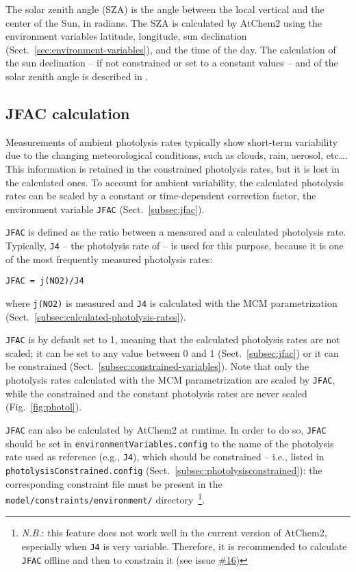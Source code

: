 The solar zenith angle (SZA) is the angle between the local vertical
and the center of the Sun, in radians. The SZA is calculated by
AtChem2 using the environment variables latitude, longitude, sun
declination (Sect.~\ref{sec:environment-variables}), and the time of
the day. The calculation of the sun declination -- if not constrained
or set to a constant values -- and of the solar zenith angle is
described in \citet{madronich_1993}.

\subsection{JFAC calculation} \label{subsec:jfac-calculation}

Measurements of ambient photolysis rates typically show short-term
variability due to the changing meteorological conditions, such as
clouds, rain, aerosol, etc\ldots. This information is retained in the
constrained photolysis rates, but it is lost in the calculated
ones. To account for ambient variability, the calculated photolysis
rates can be scaled by a constant or time-dependent correction factor,
the environment variable \texttt{JFAC} (Sect.~\ref{subsec:jfac}).

\texttt{JFAC} is defined as the ratio between a measured and a
calculated photolysis rate. Typically, \texttt{J4} -- the photolysis
rate of  -- is used for this purpose, because it is one of the
most frequently measured photolysis rates:

\begin{verbatim}
JFAC = j(NO2)/J4
\end{verbatim}

where \texttt{j(NO2)} is measured and \texttt{J4} is calculated with
the MCM parametrization (Sect.~\ref{subsec:calculated-photolysis-rates}).

\texttt{JFAC} is by default set to 1, meaning that the calculated
photolysis rates are not scaled; it can be set to any value between 0
and 1 (Sect.~\ref{subsec:jfac}) or it can be constrained
(Sect.~\ref{subsec:constrained-variables}). Note that only the
photolysis rates calculated with the MCM parametrization are scaled by
\texttt{JFAC}, while the constrained and the constant photolysis rates
are never scaled (Fig.~\ref{fig:photol}).

\texttt{JFAC} can also be calculated by AtChem2 at runtime. In order
to do so, \texttt{JFAC} should be set in
\texttt{environmentVariables.config} to the name of the photolysis
rate used as reference (e.g., \texttt{J4}), which should be
constrained -- i.e., listed in \texttt{photolysisConstrained.config}
(Sect.~\ref{subsec:photolysisconstrained}): the corresponding
constraint file must be present in the
\texttt{model/constraints/environment/} directory~\footnote{\textit{N.B.}:
  this feature does not work well in the current version of AtChem2,
  especially when \texttt{J4} is very variable. Therefore, it is
  recommended to calculate \texttt{JFAC} offline and then to constrain
  it (see issue \href{https://github.com/AtChem/AtChem2/issues/16}{\#16})}.

